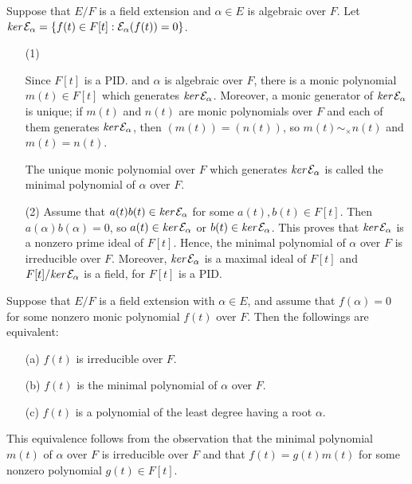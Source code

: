 \begin{obs}\label{min.poly}
    Suppose that $E/F$ is a field extension and $\alpha\in E$ is algebraic over $F$.
    Let $\textit{ker\,}{\mathcal{E}}_\alpha=\{f(t)\in F[t]: {\mathcal{E}}_\alpha(f(t))=0\}$.
    \begin{enumerate}
        \item[(1)]
        {
            Since $F[t]$ is a PID. and $\alpha$ is algebraic over $F$, there is a monic polynomial $m(t)\in F[t]$ which generates $\textit{ker\,}{\mathcal{E}}_\alpha$.
            Moreover, a monic generator of $\textit{ker\,}{\mathcal{E}}_\alpha$ is unique; if $m(t)$ and $n(t)$ are monic polynomials over $F$ and each of them generates $\textit{ker\,}{\mathcal{E}}_\alpha$, then $(m(t))=(n(t))$, so $m(t)\sim_\times n(t)$ and $m(t)=n(t)$.
            \begin{defi}
                The unique monic polynomial over $F$ which generates $\textit{ker\,}{\mathcal{E}}_\alpha$ is called the minimal polynomial of $\alpha$ over $F$.
            \end{defi}
        }
        \item[(2)]
        {
            Assume that $a(t)b(t)\in \textit{ker\,}{\mathcal{E}}_\alpha$ for some $a(t), b(t)\in F[t]$.
            Then $a(\alpha)b(\alpha)=0$, so $a(t)\in \textit{ker\,}{\mathcal{E}}_\alpha$ or $b(t)\in \textit{ker\,}{\mathcal{E}}_\alpha$.
            This proves that $\textit{ker\,}{\mathcal{E}}_\alpha$ is a nonzero prime ideal of $F[t]$.
            Hence, the minimal polynomial of $\alpha$ over $F$ is irreducible over $F$.
            Moreover, $\textit{ker\,}{\mathcal{E}}_\alpha$ is a maximal ideal of $F[t]$ and $F[t]/\textit{ker\,}{\mathcal{E}}_\alpha$ is a field, for $F[t]$ is a PID.
        }
    \end{enumerate}

    Suppose that $E/F$ is a field extension with $\alpha\in E$, and assume that $f(\alpha)=0$ for some nonzero monic polynomial $f(t)$ over $F$.
    Then the followings are equivalent:
    \begin{enumerate}
        \item[(a)]
        {
            $f(t)$ is irreducible over $F$.
        }
        \item[(b)]
        {
            $f(t)$ is the minimal polynomial of $\alpha$ over $F$.
        }
        \item[(c)]
        {
            $f(t)$ is a polynomial of the least degree having a root $\alpha$.
        }
    \end{enumerate}
    This equivalence follows from the observation that the minimal polynomial $m(t)$ of $\alpha$ over $F$ is irreducible over $F$ and that $f(t)=g(t)m(t)$ for some nonzero polynomial $g(t)\in F[t]$.
\end{obs}
